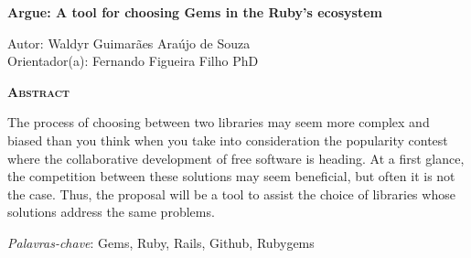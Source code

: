 \begin{center}
	{\Large{\textbf{Argue: A tool for choosing Gems in the Ruby's ecosystem}}}
\end{center}

\vspace{1cm}

\begin{flushright}
	Autor: Waldyr Guimarães Araújo de Souza\\
	Orientador(a): Fernando Figueira Filho PhD
\end{flushright}

\vspace{1cm}

\begin{center}
	\Large{\textsc{\textbf{Abstract}}}
\end{center}

\noindent The process of choosing between two libraries may seem more complex and biased than you think when you take into consideration the popularity contest where the collaborative development of free software is heading. At a first glance, the competition between these solutions may seem beneficial, but often it is not the case. Thus, the proposal will be a tool to assist the choice of libraries whose solutions address the same problems.

\noindent\textit{Palavras-chave}: Gems, Ruby, Rails, Github, Rubygems